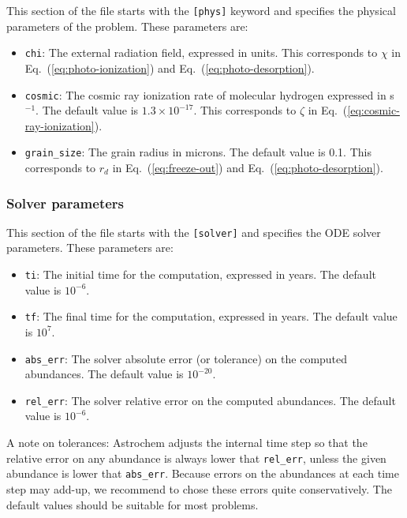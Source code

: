 \documentclass[a4paper,12pt]{article}
\begin{document}
This section of the file starts with the \verb=[phys]= keyword and
specifies the physical parameters of the problem. These parameters
are:

\begin{itemize}

\item \verb=chi=: The external radiation field, expressed in
  \citet{Habing68} units. This corresponds to $\chi$ in
  Eq.~(\ref{eq:photo-ionization}) and Eq.~(\ref{eq:photo-desorption}).

\item \verb=cosmic=: The cosmic ray ionization rate of molecular
  hydrogen expressed in s$^{-1}$. The default value is $1.3 \times
  10^{-17}$. This corresponds to $\zeta$ in
  Eq.~(\ref{eq:cosmic-ray-ionization}).

\item \verb=grain_size=: The grain radius in microns. The default
  value is 0.1. This corresponds to $r_{d}$ in
  Eq.~(\ref{eq:freeze-out}) and Eq.~(\ref{eq:photo-desorption}).

\end{itemize}

\subsubsection{Solver parameters}
\label{sec:solver-parameters}

This section of the file starts with the \verb=[solver]= and specifies
the ODE solver parameters. These parameters are:

\begin{itemize}

\item \verb=ti=: The initial time for the computation, expressed in
  years. The default value is $10^{-6}$.

\item \verb=tf=: The final time for the computation, expressed in
  years. The default value is $10^{7}$.

\item \verb=abs_err=: The solver absolute error (or tolerance) on the
  computed abundances. The default value is $10^{-20}$.

\item \verb=rel_err=: The solver relative error on the computed
  abundances. The default value is $10^{-6}$.

\end{itemize}

A note on tolerances: Astrochem adjusts the internal time step so that
the relative error on any abundance is always lower that
\verb=rel_err=, unless the given abundance is lower that
\verb=abs_err=. Because errors on the abundances at each time step may
add-up, we recommend to chose these errors quite conservatively. The
default values should be suitable for most problems.
\end{document}
